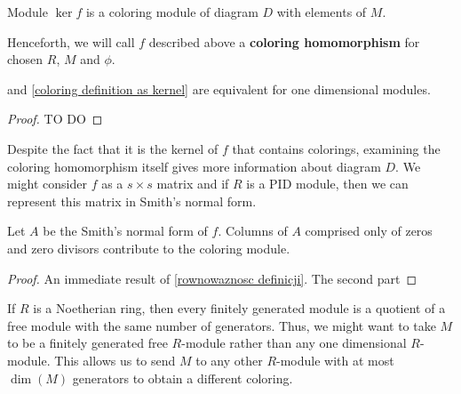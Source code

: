 \begin{definition}\label{coloring definition as kernel}
  Module $\ker f$ is a coloring module of diagram $D$ with elements of $M$.
\end{definition}

Henceforth, we will call $f$ described above a \textbf{coloring homomorphism} for chosen $R$, $M$ and $\phi$.

\begin{corollary}\label{rownowaznosc definicji}
   and \cref{coloring definition as kernel} are equivalent for one dimensional modules.
\end{corollary}

\begin{proof}
  {\large\color{red}TO DO}
\end{proof}

Despite the fact that it is the kernel of $f$ that contains colorings, examining the coloring homomorphism itself gives more information about diagram $D$. We might consider $f$ as a $s\times s$ matrix and if $R$ is a PID module, then we can represent this matrix in Smith's normal form. 

\begin{proposition}
  Let $A$ be the Smith's normal form of $f$. Columns of $A$ comprised only of zeros and zero divisors contribute to the coloring module. %
\end{proposition}

\begin{proof}
  An immediate result of \cref{rownowaznosc definicji}. The second part 
\end{proof}


{\color{blue}
If $R$ is a Noetherian ring, then every finitely generated module is a quotient of a free module with the same number of generators. Thus, we might want to take $M$ to be a finitely generated free $R$-module rather than any one dimensional $R$-module. This allows us to send $M$ to any other $R$-module with at most $\dim (M)$ generators to obtain a different coloring.
}

